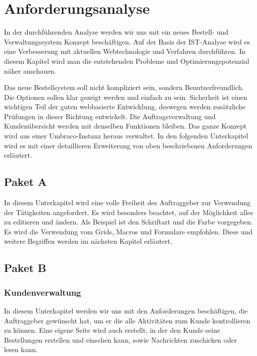 \chapter{Anforderungsanalyse}

In der durchführenden Analyse werden wir uns mit ein neues Bestell- und Verwaltungssystem Konzept beschäftigen. Auf der Basis der IST-Analyse wird es eine Verbesserung mit aktuellen Webtechnologie und Verfahren durchführen.
In diesem Kapitel wird man die entstehenden Probleme und Optimierungspotenzial näher anschauen.

Das neue Bestellsystem soll nicht kompliziert sein, sondern Benutzerfreundlich. Die Optionen sollen klar gezeigt werden und einfach zu sein. Sicherheit ist einen wichtigen Teil der guten webbasierte Entwicklung, deswegen werden zusätzliche Prüfungen in dieser Richtung entwickelt.
Die Auftragsverwaltung und Kundenübersicht werden mit denselben Funktionen bleiben.
Das ganze Konzept wird aus einer Umbraco-Instanz heraus verwaltet.
In den folgenden Unterkapitel wird es mit einer detaillieren Erweiterung von oben beschriebenen Anforderungen erläutert.

\section{Paket A}
In diesem Unterkapitel wird eine volle Freiheit des Auftraggeber zur Verwendung der Tätigkeiten angefordert. Es wird besonders beachtet, auf der Möglichkeit alles zu editieren und ändern. Als Beispiel ist den Schriftart und die Farbe vorgegeben.
Es wird die Verwendung vom Grids, Macros und Formulare empfohlen. 
Diese und weitere Begriffen werden im nächsten Kapitel erläutert.

\section{Paket B}


\subsection{Kundenverwaltung}

In diesem Unterkapitel werden wir uns mit den Anforderungen beschäftigen, die Auftraggeber gewünscht hat, um er die alle Aktivitäten zum Kunde kontrollieren zu können. Eine eigene Seite wird auch erstellt, in der den Kunde seine Bestellungen erstellen und einsehen kann, sowie Nachrichten zuschicken oder lesen kann.

